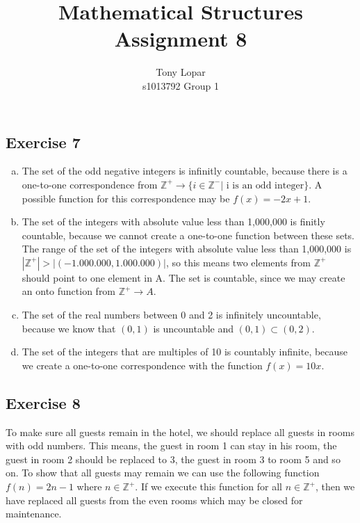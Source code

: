 \documentclass[a4paper]{article}
\title{Mathematical Structures\\Assignment 8}
\author{Tony Lopar \\ s1013792 \quad Group 1}
\newcommand{\exercise}[2]{\subsection*{Exercise #1}{#2}}
\newcommand{\exerciseenum}[2]{\subsection*{Exercise #1}{\begin{enumerate}[a)]#2\end{enumerate}}}
\newcommand{\ZZp}{\ensuremath{\mathbb{Z}^{+}}}
\begin{document}
\maketitle


\exerciseenum{7}{%
\addtocounter{enumi}{1}
\item%
The set of the odd negative integers is infinitly countable,
because there is a one-to-one correspondence from $\ZZp \rightarrow \{i \in \mathbb{Z^-} | \text{ i is an odd integer}\}$. A possible function for this correspondence may be $f(x) = -2x + 1$.

\item%
The set of the integers with absolute value less than 1,000,000 is finitly countable,
because we cannot create a one-to-one function between these sets. The range of the set of the integers with absolute value less than 1,000,000 is $|\ZZp| > |(-1.000.000, 1.000.000)|$, so this means two elements from $\ZZp$ should point to one element in A. The set is countable, since we may create an onto function from $\ZZp \rightarrow A$.

\item%
The set of the real numbers between 0 and 2 is infinitely uncountable,
because we know that $(0, 1)$ is uncountable and $(0, 1) \subset (0, 2)$.

\addtocounter{enumi}{1}
\item%
The set of the integers that are multiples of 10 is countably infinite,
because we create a one-to-one correspondence with the function $f(x) = 10x$.
}

\exercise{8}{%
To make sure all guests remain in the hotel, we should replace all guests in rooms with odd numbers. This means, the guest in room 1 can stay in his room, the guest in room 2 should be replaced to 3, the guest in room 3 to room 5 and so on. To show that all guests may remain we can use the following function $f(n) = 2n - 1$ where $n \in \ZZp$. If we execute this function for all $n \in \ZZp$, then we have replaced all guests from the even rooms which may be closed for maintenance.
}
\end{document}
